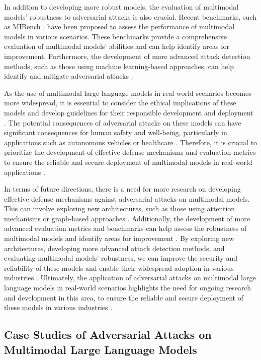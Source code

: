 \documentclass[11pt,a4paper]{article}
\begin{document}
In addition to developing more robust models, the evaluation of multimodal models' robustness to adversarial attacks is also crucial. Recent benchmarks, such as MIBench \cite{arxiv:2407.15272}, have been proposed to assess the performance of multimodal models in various scenarios. These benchmarks provide a comprehensive evaluation of multimodal models' abilities and can help identify areas for improvement. Furthermore, the development of more advanced attack detection methods, such as those using machine learning-based approaches, can help identify and mitigate adversarial attacks \cite{arxiv:2408.13257}.

As the use of multimodal large language models in real-world scenarios becomes more widespread, it is essential to consider the ethical implications of these models and develop guidelines for their responsible development and deployment \cite{arxiv:2412.02104}. The potential consequences of adversarial attacks on these models can have significant consequences for human safety and well-being, particularly in applications such as autonomous vehicles or healthcare \cite{doi:10.1038/s41539-025-00301-w}. Therefore, it is crucial to prioritize the development of effective defense mechanisms and evaluation metrics to ensure the reliable and secure deployment of multimodal models in real-world applications \cite{arxiv:2402.00891}.

In terms of future directions, there is a need for more research on developing effective defense mechanisms against adversarial attacks on multimodal models. This can involve exploring new architectures, such as those using attention mechanisms or graph-based approaches \cite{arxiv:2408.15998}. Additionally, the development of more advanced evaluation metrics and benchmarks can help assess the robustness of multimodal models and identify areas for improvement \cite{arxiv:2408.08632}. By exploring new architectures, developing more advanced attack detection methods, and evaluating multimodal models' robustness, we can improve the security and reliability of these models and enable their widespread adoption in various industries \cite{arxiv:2403.03627}. Ultimately, the application of adversarial attacks on multimodal large language models in real-world scenarios highlights the need for ongoing research and development in this area, to ensure the reliable and secure deployment of these models in various industries \cite{arxiv:2506.04788}.


\subsection{Case Studies of Adversarial Attacks on Multimodal Large Language Models}
\end{document}
